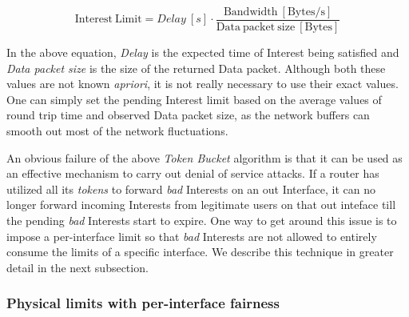 \begin{equation}
\mathrm{Interest\ Limit} = Delay\ [s] \cdot \frac{\mathrm{Bandwidth\ [Bytes/s]}}{\mathrm{Data\ packet\ size\ [Bytes]}}
\end{equation}

In the above equation, \emph{Delay} is the expected time of Interest being satisfied and \emph{Data packet size} is the size of the returned Data packet.
Although both these values are not known {\it apriori}, it is not really necessary to use their exact values.
One can simply set the pending Interest limit based on the average values of round trip time and observed Data packet size, as the network buffers can smooth out most of the network fluctuations.

An obvious failure of the above {\it Token Bucket} algorithm is that it can be used as an effective mechanism to carry out denial of service attacks. If a router has utilized all its {\it tokens} to forward {\it bad} Interests on an out Interface, it can no longer forward incoming Interests from legitimate users on that out inteface till the pending {\it bad} Interests start to expire. One way to get around this issue is to impose a per-interface limit so that {\it bad} Interests are not allowed to entirely consume the limits of a specific interface. We describe this technique in greater detail in the next subsection.

%
%
%




\subsubsection{\textbf{Physical limits with per-interface fairness}}
\label{sec:queuing}



